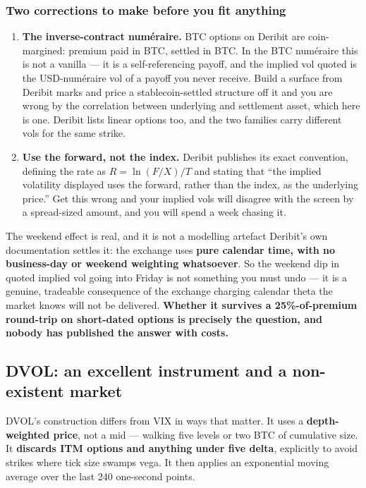 \documentclass[11pt,a4paper]{article}
\begin{document}
\subsubsection{Two corrections to make before you fit anything}

\begin{enumerate}
\item \textbf{The inverse-contract numéraire.} BTC options on Deribit are
coin-margined: premium paid in BTC, settled in BTC. In the BTC numéraire this is
not a vanilla --- it is a self-referencing payoff, and the implied vol quoted is
the USD-numéraire vol of a payoff you never receive. Build a surface from Deribit
marks and price a stablecoin-settled structure off it and you are wrong by the
correlation between underlying and settlement asset, which here is one. Deribit
lists linear options too, and the two families carry different vols for the same
strike.
\item \textbf{Use the forward, not the index.} Deribit publishes its exact
convention, defining the rate as $R = \ln(F/X)/T$ and stating that ``the implied
volatility displayed uses the forward, rather than the index, as the underlying
price.'' Get this wrong and your implied vols will disagree with the screen by a
spread-sized amount, and you will spend a week chasing it.
\end{enumerate}

\begin{keyfact}{The weekend effect is real, and it is not a modelling artefact}
Deribit's own documentation settles it: the exchange uses \textbf{pure calendar
time, with no business-day or weekend weighting whatsoever}. So the weekend dip in
quoted implied vol going into Friday is not something you must undo --- it is a
genuine, tradeable consequence of the exchange charging calendar theta the market
knows will not be delivered. \textbf{Whether it survives a 25\%-of-premium
round-trip on short-dated options is precisely the question, and nobody has
published the answer with costs.}
\end{keyfact}

\subsection{DVOL: an excellent instrument and a non-existent market}

DVOL's construction differs from VIX in ways that matter. It uses a
\textbf{depth-weighted price}, not a mid --- walking five levels or two BTC of
cumulative size. It \textbf{discards ITM options and anything under five delta},
explicitly to avoid strikes where tick size swamps vega. It then applies an
exponential moving average over the last 240 one-second points.
\end{document}

